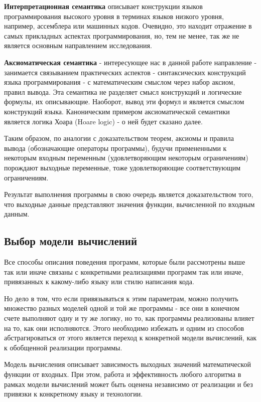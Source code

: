 \documentclass[a4paper,14pt]{extreport} %
\begin{document}
	\textbf{Интерпретационная семантика} описывает конструкции языков программирования высокого уровня в терминах языков низкого уровня, например, ассемблера или машинных кодов. Очевидно, это находит отражение в самых прикладных аспектах программирования, но, тем не менее, так же не является основным направлением исследования.

	\textbf{Аксиоматическая семантика} - интересующее нас в данной работе направление - занимается связыванием практических аспектов - синтаксических конструкций языка программирования - с математическим смыслом через набор аксиом, правил вывода. Эта семантика не разделяет смысл конструкций и логические формулы, их описывающие. Наоборот, вывод эти формул и является смыслом конструкций языка. Каноническим примером аксиоматической семантики является логика Хоара (Hoare logic) - о ней будет сказано далее.

	Таким образом, по аналогии с доказательством теорем, аксиомы и правила вывода (обозначающие операторы программы), будучи примененными к некоторым входным переменным (удовлетворяющим некоторым ограничениям) порождают выходные переменные, тоже удовлетворяющие соответствующим ограничениям.

	Результат выполнения программы в свою очередь является доказательством того, что выходные данные представляют значения функции, вычисленной по входным данным.




{\subsection{Выбор модели вычислений}}

	Все способы описания поведения программ, которые были рассмотрены выше так или иначе связаны с конкретными реализациями программ так или иначе, привязанных к какому-либо языку или стилю написания кода.

	Но дело в том, что если привязываться к этим параметрам, можно получить множество разных моделей одной и той же программы - все они в конечном счете выполняют одну и ту же логику, но то, как программы реализованы влияет на то, как они исполняются. Этого необходимо избежать и одним из способов абстрагироваться от этого является переход к конкретной модели вычислений, как к обобщенной реализации программы.

	Модель вычисления описывает зависимость выходных значений математической функции от входных. При этом, работа и эффективность любого алгоритма в рамках модели вычислений может быть оценена независимо от реализации и без привязки к конкретному языку и технологии.
\end{document}
